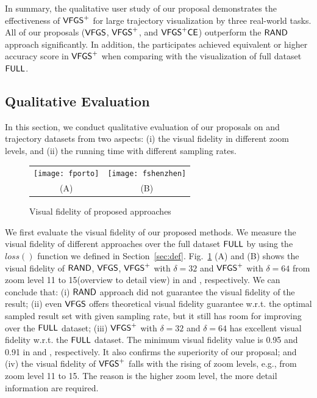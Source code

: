 In summary, the qualitative user study of our proposal demonstrates the effectiveness of $\mathsf{VFGS}^{+}$ for large trajectory visualization by three real-world tasks.
All of our proposals ($\mathsf{VFGS}$, $\mathsf{VFGS}^{+}$, and $\mathsf{VFGS}^{+}\mathsf{CE}$) outperform the $\mathsf{RAND}$ approach significantly.
In addition, the participates achieved equivalent or higher accuracy score in $\mathsf{VFGS}^{+}$ when comparing with the visualization of full dataset $\mathsf{FULL}$.


\subsection{Qualitative Evaluation}\label{sec:quality}
In this section, we conduct qualitative evaluation of our proposals on \pt{} and \sz{} trajectory datasets from two aspects: (i) the visual fidelity in different zoom levels,
and (ii) the running time with different sampling rates.

\begin{figure}
 \centering
 \small
 \begin{tabular}{cc}
   \texttt{[image: fporto]}
   &
   \texttt{[image: fshenzhen]}
   \\
   (A) \pt{}
   &
   (B) \sz{}
 \end{tabular}
 \vspace{-2mm}
 \caption{Visual fidelity of proposed approaches}
 \label{fig:fidelity}
 \vspace{-4mm}
\end{figure}

We first evaluate the visual fidelity of our proposed methods.
We measure the visual fidelity of different approaches over the full dataset $\mathsf{FULL}$ by using the $loss()$ function we defined in Section~\ref{sec:def}.
Fig.~\ref{fig:fidelity} (A) and (B) shows the visual fidelity of $\mathsf{RAND}$, $\mathsf{VFGS}$, $\mathsf{VFGS}^{+}$ with $\delta=32$ and $\mathsf{VFGS}^{+}$ with $\delta=64$ from zoom level 11 to 15(overview to detail view) in
\pt{} and \sz{}, respectively.
We can conclude that: (i) $\mathsf{RAND}$ approach did not guarantee the visual fidelity of the result;
(ii) even $\mathsf{VFGS}$ offers theoretical visual fidelity guarantee w.r.t. the optimal sampled result set with given sampling rate, but it still has room for improving over the $\mathsf{FULL}$ dataset;
(iii) $\mathsf{VFGS}^{+}$ with $\delta=32$ and $\delta=64$ has excellent visual fidelity w.r.t. the $\mathsf{FULL}$ dataset. The minimum visual fidelity value is 0.95 and 0.91 in \pt{} and \sz{}, respectively.
It also confirms the superiority of our proposal;
and (iv) the visual fidelity of $\mathsf{VFGS}^{+}$ falls with the rising of zoom levels, e.g., from zoom level 11 to 15.
The reason is the higher zoom level, the more detail information are required.


